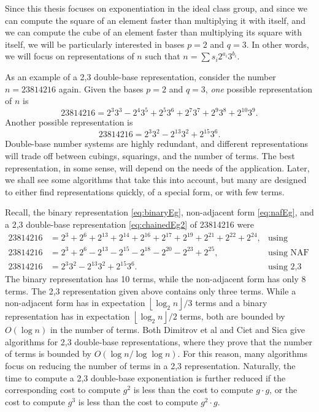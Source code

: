 \documentclass{ucalgthes1}
\theoremstyle{plain}
\theoremstyle{definition}
\newcommand{\floor}[1]{\left\lfloor #1 \right\rfloor}
\begin{document}
Since this thesis focuses on exponentiation in the ideal class group, and since we can compute the square of an element faster than multiplying it with itself, and we can compute the cube of an element faster than multiplying its square with itself, we will be particularly interested in bases $p=2$ and $q=3$.  In other words, we will focus on representations of $n$ such that $n = \sum s_i 2^{a_i} 3^{b_i}$.

As an example of a 2,3 double-base representation, consider the number $n=23814216$ again.  Given the bases $p=2$ and $q=3$, \emph{one} possible representation of $n$ is
\begin{equation}\label{eq:chainedEg1}
	23814216 = 2^3 3^3 - 2^4 3^5 + 2^5 3^6  + 2^7 3^7  + 2^9 3^8 + 2^{10} 3^9.
\end{equation}
Another possible representation is
\begin{equation}\label{eq:chainedEg2}
	23814216 = 2^3 3^2 -2^{13} 3^2 +2^{15} 3^6.
\end{equation}
Double-base number systems are highly redundant, and different representations will trade off between cubings, squarings, and the number of terms.  The best representation, in some sense, will depend on the needs of the application.  Later, we shall see some algorithms that take this into account, but many are designed to either find representations quickly, of a special form, or with few terms.

Recall, the binary representation \eqref{eq:binaryEg}, non-adjacent form \eqref{eq:nafEg}, and a 2,3 double-base representation \eqref{eq:chainedEg2} of 23814216 were
\begin{align*}
	23814216 &= 2^3+2^6+2^{13}+2^{14}+2^{16}+2^{17}+2^{19}+2^{21}+2^{22}+2^{24}, & \mbox{using binary} \\
	23814216 &= 2^3+2^6-2^{13}-2^{15}-2^{18}-2^{20}-2^{23}+2^{25}, & \mbox{using NAF} \\
	23814216 &= 2^3 3^2 -2^{13} 3^2 +2^{15} 3^6. & \mbox{using 2,3 DBNS}
\end{align*}
The binary representation has 10 terms, while the non-adjacent form has only 8 terms.  The 2,3 representation given above contains only three terms.  While a non-adjacent form has in expectation $\floor{\log_2 n}/3$ terms and a binary representation has in expectation $\floor{\log_2 n}/2$ terms, both are bounded by $O(\log n)$ in the number of terms.  Both Dimitrov et al \cite{Dimitrov2008} and Ciet and Sica \cite{Ciet2005} give algorithms for 2,3 double-base representations, where they prove that the number of terms is bounded by $O(\log n / \log \log n)$.  For this reason, many algorithms focus on reducing the number of terms in a 2,3 representation.   Naturally, the time to compute a 2,3 double-base exponentiation is further reduced if the corresponding cost to compute $g^2$ is less than the cost to compute $g \cdot g$, or the cost to compute $g^3$ is less than the cost to compute $g^2 \cdot g$. 
\end{document}
